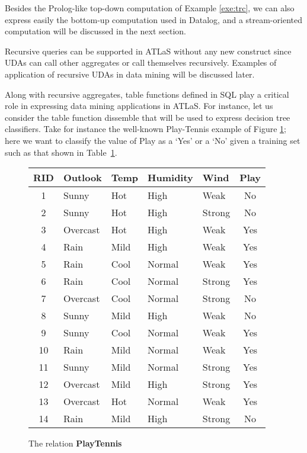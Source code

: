 Besides the  Prolog-like top-down
computation of Example \ref{exe:trc}, we can also express easily the
bottom-up computation used in  Datalog,
and a stream-oriented computation will be discussed in the next section.

Recursive queries can
be supported in  ATLaS without any
new construct since UDAs can call other
aggregates or call themselves recursively. Examples of
application of recursive UDAs in data mining will be discussed
later.

Along with recursive aggregates, table functions defined in SQL play a
critical role in expressing data mining applications in ATLaS.  For
instance, let us consider the table function {\bw dissemble} that will
be used to express decision tree classifiers.  Take for instance
the well-known Play-Tennis example of Figure \ref{tab:newtennis}; here we
want to classify the value of {\bw Play} as a `Yes' or a `No' given a
training set such as that shown in Table~\ref{tab:newtennis}.

{\renewcommand{\baselinestretch}{1}
\normalsize
\begin{figure}[htb]
\begin{center}
{\footnotesize
\begin{tabular}{|c|l|l|l|l|c|} \hline
{\bf RID}&{\bf Outlook}&{\bf Temp}&{\bf Humidity}&{\bf Wind}&{\bf Play}\\
\hline
1&Sunny&Hot&High&Weak&No\\
2&Sunny&Hot&High&Strong&No\\
3&Overcast&Hot&High&Weak&Yes\\
4&Rain&Mild&High&Weak&Yes\\
5&Rain&Cool&Normal&Weak&Yes\\
6&Rain&Cool&Normal&Strong&Yes\\
7&Overcast&Cool&Normal&Strong&No\\
8&Sunny&Mild&High&Weak&No\\
9&Sunny&Cool&Normal&Weak&Yes\\
10&Rain&Mild&Normal&Weak&Yes\\
11&Sunny&Mild&Normal&Strong&Yes\\
12&Overcast&Mild&High&Strong&Yes\\
13&Overcast&Hot&Normal&Weak&Yes\\
14&Rain&Mild&High&Strong&No\\ \hline
\end{tabular}
}
\caption{The relation \bf PlayTennis\inv \inv} \label{tab:newtennis}
\end{center}
\end{figure}
}

